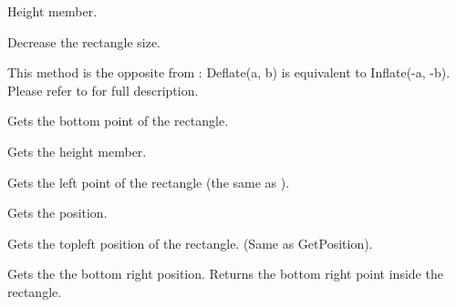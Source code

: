 
Height member.


\label{wxrectdeflate}




Decrease the rectangle size.

This method is the opposite from :
Deflate(a, b) is equivalent to Inflate(-a, -b).
Please refer to  for full description.




\label{wxrectgetbottom}


Gets the bottom point of the rectangle.


\label{wxrectgetheight}


Gets the height member.


\label{wxrectgetleft}


Gets the left point of the rectangle (the same as ).


\label{wxrectgetposition}


Gets the position.


\label{wxrectgettopleft}


Gets the topleft position of the rectangle. (Same as GetPosition).


\label{wxrectgetbottomright}


Gets the the bottom right position. Returns the bottom right point inside the rectangle.


\label{wxrectgetright}

